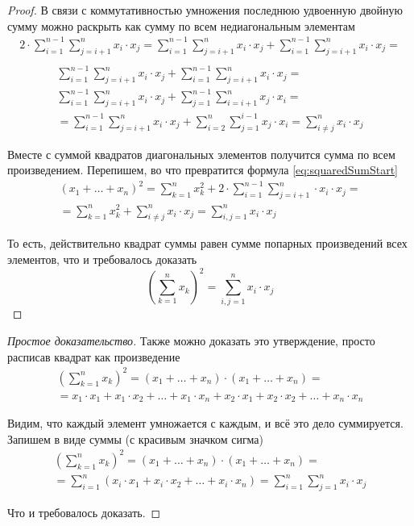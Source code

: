 \begin{proof}
  В связи с коммутативностью умножения последнюю удвоенную двойную сумму можно
  раскрыть как сумму по всем недиагональным элементам
  \begin{align*}
      2 \cdot \sum_{i=1}^{n-1} \sum_{j=i+1}^n x_i \cdot x_j
      = \sum_{i=1}^{n-1} \sum_{j=i+1}^n x_i \cdot x_j
          + \sum_{i=1}^{n-1} \sum_{j=i+1}^n x_i \cdot x_j = \\
  \end{align*}
  \begin{align*}
      \sum_{i=1}^{n-1} \sum_{j=i+1}^n x_i \cdot x_j
          + \sum_{i=1}^{n-1} \sum_{j=i+1}^n x_i \cdot x_j = \\
      \sum_{i=1}^{n-1} \sum_{j=i+1}^n x_i \cdot x_j
          + \sum_{j=1}^{n-1} \sum_{i=i+1}^n x_j \cdot x_i = \\
      = \sum_{i=1}^{n-1} \sum_{j=i+1}^n x_i \cdot x_j
          + \sum_{i=2}^{n} \sum_{j=1}^{i-1} x_j \cdot x_i
      = \sum_{i \neq j}^{n} x_i \cdot x_j
  \end{align*}

  Вместе с суммой квадратов диагональных элементов получится сумма по всем
  произведением. Перепишем, во что превратится формула
  \eqref{eq:squaredSumStart}
  \begin{align*}
       \left( x_1 + \dots + x_n \right)^2
      = \sum_{k=1}^{n} x_k^2
          + 2 \cdot \sum_{i=1}^{n-1}
        \sum_{j=i+1}^n \cdot x_i \cdot x_j = \\
      = \sum_{k=1}^{n} x_k^2 + \sum_{i \neq j}^{n} x_i \cdot x_j
      = \sum_{i, j = 1}^{n} x_i \cdot x_j
  \end{align*}

  То есть, действительно квадрат суммы равен сумме попарных произведений всех
  элементов, что и требовалось доказать
  $$\left( \sum_{k=1}^n x_k \right)^2 = \sum_{i, j = 1}^{n} x_i \cdot x_j$$
\end{proof}
\begin{proof}[Простое доказательство]
  Также можно доказать это утверждение, просто расписав квадрат как
  произведение
  \begin{align*}
      \left( \sum_{k=1}^{n} x_k \right)^2
      = \left( x_1 + \dots + x_n \right)
      \cdot \left( x_1 + \dots + x_n \right) = \\
      = x_1 \cdot x_1 + x_1 \cdot x_2 + \dots + x_1 \cdot x_n
      + x_2 \cdot x_1 + x_2 \cdot x_2 + \dots + x_n \cdot x_n
  \end{align*}

  Видим, что каждый элемент умножается с каждым, и всё это дело суммируется.
  Запишем в виде суммы (с красивым значком сигма)
  \begin{align*}
      \left( \sum_{k=1}^{n} x_k \right)^2
      = \left( x_1 + \dots + x_n \right)
      \cdot \left( x_1 + \dots + x_n \right) = \\
      = \sum_{i=1}^{n}
      \left( x_i \cdot x_1 + x_i \cdot x_2 + \dots + x_i \cdot x_n \right)
      = \sum_{i=1}^{n} \sum_{j=1}^{n} x_i \cdot x_j
  \end{align*}

  Что и требовалось доказать.
\end{proof}

